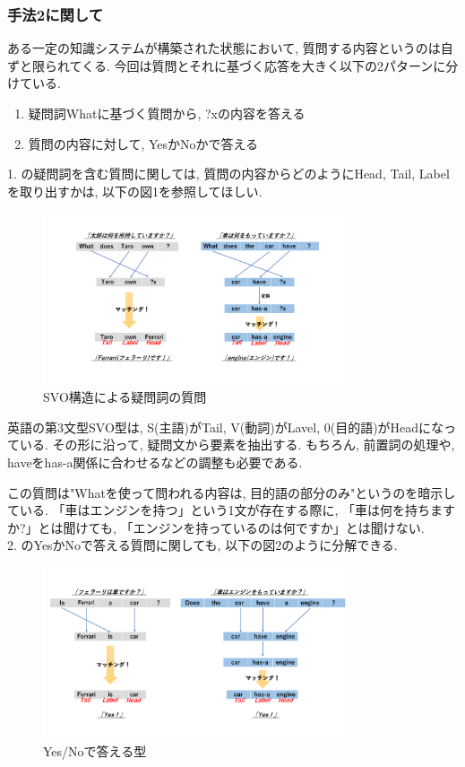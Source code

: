 ﻿\documentclass[uplatex,12pt]{jsarticle}
\begin{document}
\subsubsection{手法2に関して}
ある一定の知識システムが構築された状態において, 質問する内容というのは自ずと限られてくる. 今回は質問とそれに基づく応答を大きく以下の2パターンに分けている. 

\begin{enumerate}
\item 疑問詞Whatに基づく質問から,  ?xの内容を答える
\item 質問の内容に対して, YesかNoかで答える
\end{enumerate}

1. の疑問詞を含む質問に関しては, 質問の内容からどのようにHead, Tail, Labelを取り出すかは, 以下の図1を参照してほしい.
\begin{figure}[htbp]
 \begin{center}
  \includegraphics[width = 9cm, pagebox = cropbox, clip]{英文構造_疑問詞SVO.pdf}
 \end{center}
 \caption[]{SVO構造による疑問詞の質問}\label{fig:fig1.1}
\end{figure}

英語の第3文型SVO型は, S(主語)がTail, V(動詞)がLavel, 0(目的語)がHeadになっている. その形に沿って, 疑問文から要素を抽出する. もちろん, 前置詞の処理や, haveをhas-a関係に合わせるなどの調整も必要である.

この質問は"Whatを使って問われる内容は, 目的語の部分のみ"というのを暗示している. 「車はエンジンを持つ」という1文が存在する際に, 「車は何を持ちますか?」とは聞けても, 「エンジンを持っているのは何ですか」とは聞けない. \\

2. のYesかNoで答える質問に関しても, 以下の図2のように分解できる.
\begin{figure}[htbp]
 \begin{center}
  \includegraphics[width = 9cm, pagebox = cropbox, clip]{英文構造_YesNo型.pdf}
 \end{center}
 \caption[]{Yes/Noで答える型}\label{fig:fig1.1}
\end{figure}
\end{document}
